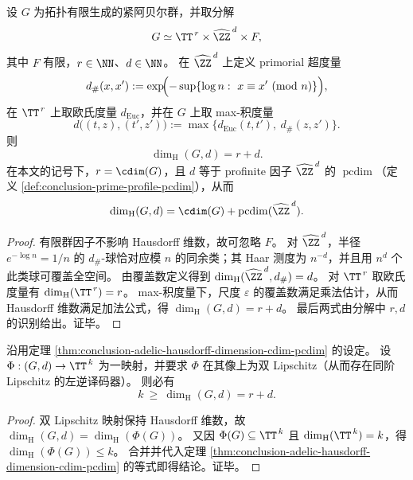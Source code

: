 \begin{theorem}\label{thm:conclusion-adelic-hausdorff-dimension-cdim-pcdim}
设 \(G\) 为拓扑有限生成的紧阿贝尔群，并取分解
\[
G\simeq \TT^{\,r}\times \widehat{\ZZ}^{\,d}\times F,
\]
其中 \(F\) 有限，\(r\in\NN\)、\(d\in\NN\)。
在 \(\widehat{\ZZ}^{\,d}\) 上定义 primorial 超度量
\[
d_{\#}(x,x')
:=
\exp\!\Bigl(-\sup\{\log n:\ x\equiv x'\ (\mathrm{mod}\ n)\}\Bigr),
\]
在 \(\TT^{\,r}\) 上取欧氏度量 \(d_{\mathrm{Euc}}\)，并在 \(G\) 上取 max-积度量
\[
d\bigl((t,z),(t',z')\bigr):=\max\{d_{\mathrm{Euc}}(t,t'),\ d_{\#}(z,z')\}.
\]
则
\[
\dim_{\mathrm H}(G,d)=r+d.
\]
在本文的记号下，\(r=\cdim(G)\)，且 \(d\) 等于 profinite 因子 \(\widehat{\ZZ}^{\,d}\) 的 \(\operatorname{pcdim}\)（定义 \ref{def:conclusion-prime-profile-pcdim}），从而
\[
\dim_{\mathrm H}(G,d)=\cdim(G)+\operatorname{pcdim}(\widehat{\ZZ}^{\,d}).
\]
\end{theorem}

\begin{proof}
有限群因子不影响 Hausdorff 维数，故可忽略 \(F\)。
对 \(\widehat{\ZZ}^{\,d}\)，半径 \(e^{-\log n}=1/n\) 的 \(d_{\#}\)-球恰对应模 \(n\) 的同余类；其 Haar 测度为 \(n^{-d}\)，并且用 \(n^d\) 个此类球可覆盖全空间。
由覆盖数定义得到 \(\dim_{\mathrm H}(\widehat{\ZZ}^{\,d},d_{\#})=d\)。
对 \(\TT^{\,r}\) 取欧氏度量有 \(\dim_{\mathrm H}(\TT^{\,r})=r\)。
max-积度量下，尺度 \(\varepsilon\) 的覆盖数满足乘法估计，从而 Hausdorff 维数满足加法公式，得 \(\dim_{\mathrm H}(G,d)=r+d\)。
最后两式由分解中 \(r,d\) 的识别给出。证毕。
\end{proof}

\begin{corollary}\label{cor:conclusion-adelic-hausdorff-noncompressible-phase-dimension}
沿用定理 \ref{thm:conclusion-adelic-hausdorff-dimension-cdim-pcdim} 的设定。
设 \(\Phi:(G,d)\to \TT^{\,k}\) 为一映射，并要求 \(\Phi\) 在其像上为双 Lipschitz（从而存在同阶 Lipschitz 的左逆译码器）。
则必有
\[
k\ \ge\ \dim_{\mathrm H}(G,d)=r+d.
\]
\end{corollary}
\begin{proof}
双 Lipschitz 映射保持 Hausdorff 维数，故
\(
\dim_{\mathrm H}(G,d)=\dim_{\mathrm H}(\Phi(G))
\)。
又因 \(\Phi(G)\subseteq \TT^{\,k}\) 且 \(\dim_{\mathrm H}(\TT^{\,k})=k\)，得
\(
\dim_{\mathrm H}(\Phi(G))\le k
\)。
合并并代入定理 \ref{thm:conclusion-adelic-hausdorff-dimension-cdim-pcdim} 的等式即得结论。证毕。
\end{proof}

\endinput
